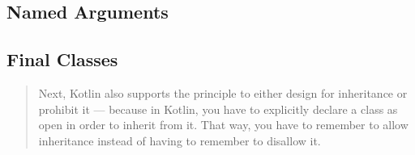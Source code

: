 \documentclass[a4paper,12pt]{report}
\begin{document}
\subsection{Named Arguments}

\subsection{Final Classes}

\begin{quotation}
Next, Kotlin also supports the principle to either design for inheritance or prohibit it — because in Kotlin, you have to explicitly declare a class as open in order to inherit from it. That way, you have to remember to allow inheritance instead of having to remember to disallow it.\cite{kotlin-sommerhoff}
\end{quotation}

\clearpage
\end{document}
